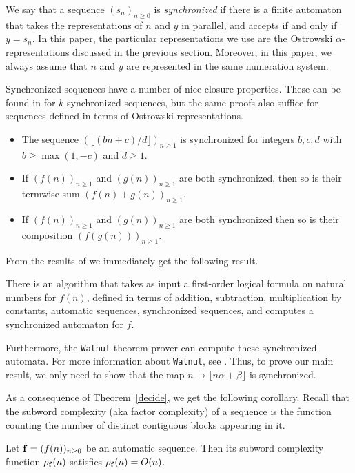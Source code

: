 \documentclass[12pt,reqno]{article}
\begin{document}
We say that a sequence $(s_n)_{n \geq 0}$ is {\it synchronized\/}
if there is a finite automaton that takes the representations of
$n$ and $y$ in parallel, and
accepts if and only if $y = s_n$.  In this paper, the particular representations
we use are the Ostrowski $\alpha$-representations discussed in the
previous section.  Moreover, in this paper, we always assume that $n$ and $y$
are represented in the same numeration system.

Synchronized sequences have a number of nice closure properties.   These can be found in \cite{Shallit:2021h} for $k$-synchronized sequences, but the same proofs also suffice for sequences defined in terms of Ostrowski representations.
\begin{proposition}
\leavevmode
\begin{itemize}
\item[(a)]  The sequence $(\lfloor (bn+c)/d \rfloor)_{n \geq 1}$ is synchronized for integers $b,c,d$ with $b \geq \max(1, -c)$ and 
$d \geq 1$.
\item[(b)] If $(f(n))_{n \geq 1}$ and $(g(n))_{n \geq 1}$
are both synchronized, then so is their termwise sum $(f(n)+g(n))_{n \geq 1}$.
\item[(c)] If $(f(n))_{n \geq 1}$ and $(g(n))_{n \geq 1}$
are both synchronized then so is
their composition $(f(g(n)))_{n \geq 1}$.
\end{itemize}
\label{prop1}
\end{proposition}

From the results of \cite{Bruyere&Hansel&Michaux&Villemaire:1994} we immediately get the following result.   
\begin{theorem}
There is an algorithm that takes as input
a first-order logical formula on natural
numbers for $f(n)$,
defined in terms of addition, subtraction, multiplication by constants,
automatic sequences, synchronized sequences, and computes a synchronized
automaton for $f$.
\label{decide}
\end{theorem}
Furthermore, the {\tt Walnut} theorem-prover can compute these synchronized automata.
For more information about {\tt Walnut}, see \cite{Mousavi:2016,Shallit:2023}.
Thus, to prove our main result, we only need to show that
the map $n \rightarrow \lfloor n \alpha + \beta \rfloor$
is synchronized.

As a consequence of Theorem~\ref{decide}, we get the following corollary.
Recall that the subword complexity (aka factor complexity) of a sequence
is the function counting the number of distinct contiguous blocks
appearing in it.
\begin{corollary}
Let ${\bf f} = (f(n))_{n \geq 0}$ be an automatic sequence.
Then its subword complexity function $\rho_{\bf f} (n)$ 
satisfies $\rho_{\bf f} (n) = O(n)$.
\label{four}
\end{corollary}
\end{document}
